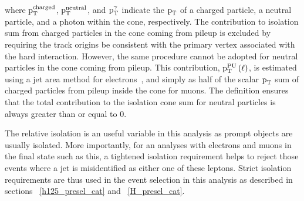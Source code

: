 where $\text{p}_\text{T}^\text{charged}$, $\text{p}_\text{T}^\text{neutral}$, and $\text{p}_\text{T}^{\gamma}$  indicate the $\text{p}_\text{T}$ of a charged particle, a neutral particle, and a photon within the cone, respectively. The contribution to isolation sum from charged particles in the cone coming from pileup is excluded by requiring the track origins be consistent with the primary vertex associated with the hard interaction. However, the same procedure cannot be adopted for neutral particles in the cone coming from pileup. This contribution, $\text{p}_\text{T}^\text{PU}\left(\ell\right)$, is estimated using a jet area method for electrons~\cite{isolation_1,isolation_2}, and simply as half of the scalar $\text{p}_\text{T}$ sum of charged particles from pileup inside the cone for muons. The definition ensures that the total contribution to the isolation cone sum for neutral particles is always greater than or equal to 0. 

The relative isolation is an useful variable in this analysis as prompt objects are usually isolated. More importantly, for an analyses with electrons and muons in the final state such as this, a tightened isolation requirement helps to reject those events where a jet is misidentified as either one of these leptons. Strict isolation requirements are thus used in the event selection in this analysis as described in sections ~\ref{h125_presel_cat} and ~\ref{H_presel_cat}.    




